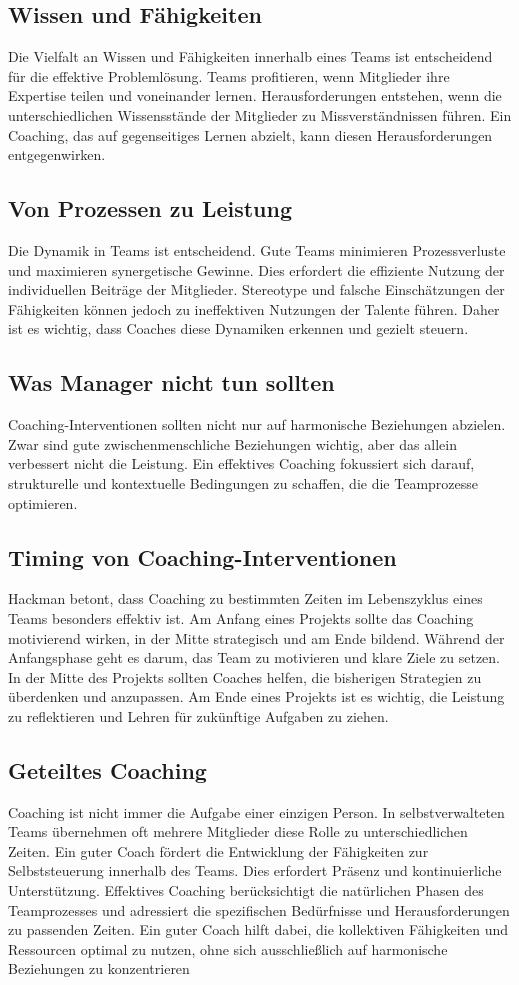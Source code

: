 \subsection{Wissen und Fähigkeiten}
Die Vielfalt an Wissen und Fähigkeiten innerhalb eines Teams ist entscheidend für die effektive Problemlösung. Teams profitieren, wenn Mitglieder ihre Expertise teilen und voneinander lernen. Herausforderungen entstehen, wenn die unterschiedlichen Wissensstände der Mitglieder zu Missverständnissen führen. Ein Coaching, das auf gegenseitiges Lernen abzielt, kann diesen Herausforderungen entgegenwirken.
\subsection{Von Prozessen zu Leistung}
Die Dynamik in Teams ist entscheidend. Gute Teams minimieren Prozessverluste und maximieren synergetische Gewinne. Dies erfordert die effiziente Nutzung der individuellen Beiträge der Mitglieder. Stereotype und falsche Einschätzungen der Fähigkeiten können jedoch zu ineffektiven Nutzungen der Talente führen. Daher ist es wichtig, dass Coaches diese Dynamiken erkennen und gezielt steuern.
\subsection{Was Manager nicht tun sollten}
Coaching-Interventionen sollten nicht nur auf harmonische Beziehungen abzielen. Zwar sind gute zwischenmenschliche Beziehungen wichtig, aber das allein verbessert nicht die Leistung. Ein effektives Coaching fokussiert sich darauf, strukturelle und kontextuelle Bedingungen zu schaffen, die die Teamprozesse optimieren.
\subsection{Timing von Coaching-Interventionen}
Hackman betont, dass Coaching zu bestimmten Zeiten im Lebenszyklus eines Teams besonders effektiv ist. Am Anfang eines Projekts sollte das Coaching motivierend wirken, in der Mitte strategisch und am Ende bildend. Während der Anfangsphase geht es darum, das Team zu motivieren und klare Ziele zu setzen. In der Mitte des Projekts sollten Coaches helfen, die bisherigen Strategien zu überdenken und anzupassen. Am Ende eines Projekts ist es wichtig, die Leistung zu reflektieren und Lehren für zukünftige Aufgaben zu ziehen.
\subsection{Geteiltes Coaching}
Coaching ist nicht immer die Aufgabe einer einzigen Person. In selbstverwalteten Teams übernehmen oft mehrere Mitglieder diese Rolle zu unterschiedlichen Zeiten. Ein guter Coach fördert die Entwicklung der Fähigkeiten zur Selbststeuerung innerhalb des Teams. Dies erfordert Präsenz und kontinuierliche Unterstützung.
Effektives Coaching berücksichtigt die natürlichen Phasen des Teamprozesses und adressiert die spezifischen Bedürfnisse und Herausforderungen zu passenden Zeiten. Ein guter Coach hilft dabei, die kollektiven Fähigkeiten und Ressourcen optimal zu nutzen, ohne sich ausschließlich auf harmonische Beziehungen zu konzentrieren

